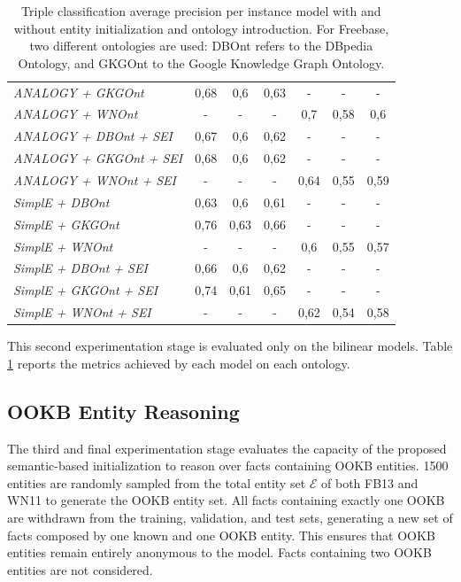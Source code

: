 \begin{table}
{\begin{tabular}{l|c|c|c|c|c|c|}
\multicolumn{1}{|l|}{\textit{ANALOGY + GKGOnt}}                          & 0,68  & 0,6    & 0,63     & -     & -      & -        \\
\multicolumn{1}{|l|}{\textit{ANALOGY + WNOnt}}                           & -     & -      & -        & 0,7   & 0,58   & 0,6      \\
\multicolumn{1}{|l|}{\textit{ANALOGY + DBOnt + SEI}}   & 0,67  & 0,6    & 0,62     & -     & -      & -        \\
\multicolumn{1}{|l|}{\textit{ANALOGY + GKGOnt + SEI}}  & 0,68  & 0,6    & 0,62     & -     & -      & -        \\
\multicolumn{1}{|l|}{\textit{ANALOGY + WNOnt + SEI}}   & -     & -      & -        & 0,64  & 0,55   & 0,59     \\ \hline
\multicolumn{1}{|l|}{\textit{SimplE + DBOnt}}                            & 0,63  & 0,6    & 0,61     & -     & -      & -        \\
\multicolumn{1}{|l|}{\textit{SimplE + GKGOnt}}                           & 0,76  & 0,63   & 0,66     & -     & -      & -        \\
\multicolumn{1}{|l|}{\textit{SimplE + WNOnt}}                            & -     & -      & -        & 0,6   & 0,55   & 0,57     \\
\multicolumn{1}{|l|}{\textit{SimplE + DBOnt + SEI}}    & 0,66  & 0,6    & 0,62     & -     & -      & -        \\
\multicolumn{1}{|l|}{\textit{SimplE + GKGOnt + SEI}}   & 0,74  & 0,61   & 0,65     & -     & -      & -        \\
\multicolumn{1}{|l|}{\textit{SimplE + WNOnt + SEI}}    & -     & -      & -        & 0,62  & 0,54   & 0,58     \\ \hline
\end{tabular}
}
\caption{Triple classification average precision per instance model with and without entity initialization and ontology introduction. For Freebase, two different ontologies are used: DBOnt refers to the DBpedia Ontology, and GKGOnt to the Google Knowledge Graph Ontology.}
\label{tab:exp_ont_intro}
\end{table}

This second experimentation stage is evaluated only on the bilinear models. Table \ref{tab:exp_ont_intro} reports the metrics achieved by each model on each ontology.

\subsection{OOKB Entity Reasoning}
The third and final experimentation stage evaluates the capacity of the proposed semantic-based initialization to reason over facts containing OOKB entities. 1500 entities are randomly sampled from the total entity set $\mathcal{E}$ of both FB13 and WN11 to generate the OOKB entity set. All facts containing exactly one OOKB are withdrawn from the training, validation, and test sets, generating a new set of facts composed by one known and one OOKB entity. This ensures that OOKB entities remain entirely anonymous to the model. Facts containing two OOKB entities are not considered.

